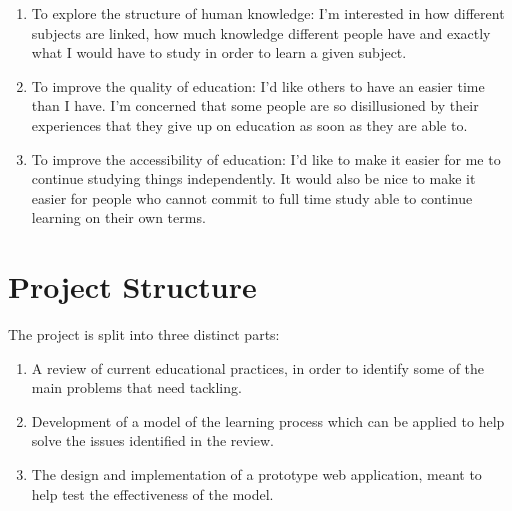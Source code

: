     \begin{enumerate}
      \item To explore the structure of human knowledge: I'm interested in how different subjects are linked, how much knowledge different people have and exactly what I would have to study in order to learn a given subject.

      \item To improve the quality of education: I'd like others to have an easier time than I have. I'm concerned that some people are so disillusioned by their experiences that they give up on education as soon as they are able to.

      \item To improve the accessibility of education: I'd like to make it easier for me to continue studying things independently. It would also be nice to make it easier for people who cannot commit to full time study able to continue learning on their own terms.
    \end{enumerate}

  \section{Project Structure}
    The project is split into three distinct parts:
    \begin{enumerate}
      \item A review of current educational practices, in order to identify some of the main problems that need tackling.
      \item Development of a model of the learning process which can be applied to help solve the issues identified in the review.
      \item The design and implementation of a prototype web application, meant to help test the effectiveness of the model.
    \end{enumerate}
